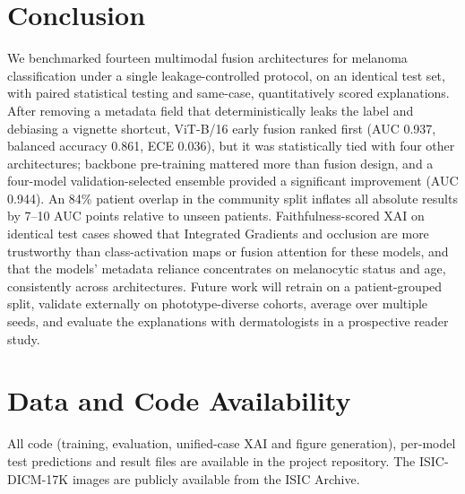 \documentclass[journal]{IEEEtran}
\begin{document}
\section{Conclusion}
We benchmarked fourteen multimodal fusion architectures for melanoma classification under a single leakage-controlled protocol, on an identical test set, with paired statistical testing and same-case, quantitatively scored explanations. After removing a metadata field that deterministically leaks the label and debiasing a vignette shortcut, ViT-B/16 early fusion ranked first (AUC 0.937, balanced accuracy 0.861, ECE 0.036), but it was statistically tied with four other architectures; backbone pre-training mattered more than fusion design, and a four-model validation-selected ensemble provided a significant improvement (AUC 0.944). An 84\% patient overlap in the community split inflates all absolute results by 7--10 AUC points relative to unseen patients. Faithfulness-scored XAI on identical test cases showed that Integrated Gradients and occlusion are more trustworthy than class-activation maps or fusion attention for these models, and that the models' metadata reliance concentrates on melanocytic status and age, consistently across architectures.
Future work will retrain on a patient-grouped split, validate externally on phototype-diverse cohorts, average over multiple seeds, and evaluate the explanations with dermatologists in a prospective reader study.

\section*{Data and Code Availability}
All code (training, evaluation, unified-case XAI and figure generation), per-model test predictions and result files are available in the project repository. The ISIC-DICM-17K images are publicly available from the ISIC Archive.
\end{document}
